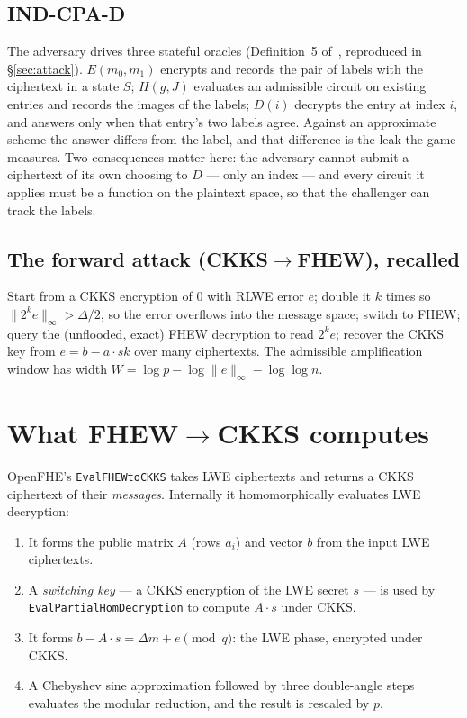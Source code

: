 \documentclass[11pt]{article}
\newcommand{\fto}{\texorpdfstring{FHEW$\to$CKKS}{FHEW-to-CKKS}}
\newcommand{\ctf}{\texorpdfstring{CKKS$\to$FHEW}{CKKS-to-FHEW}}
\newcommand{\code}[1]{\texttt{#1}}
\begin{document}
\subsection{IND-CPA-D}
The adversary drives three stateful oracles (Definition~5 of~\cite{santato2026}, reproduced in
\S\ref{sec:attack}). $E(m_0, m_1)$ encrypts and records the pair of labels with the ciphertext in
a state $S$; $H(g, J)$ evaluates an admissible circuit on existing entries and records the images
of the labels; $D(i)$ decrypts the entry at index $i$, and answers only when that entry's two
labels agree. Against an approximate scheme the answer differs from the label, and that difference
is the leak the game measures. Two consequences matter here: the adversary cannot submit a
ciphertext of its own choosing to $D$ --- only an index --- and every circuit it applies must be a
function on the plaintext space, so that the challenger can track the labels.

\subsection{The forward attack (\ctf{}), recalled}
Start from a CKKS encryption of $0$ with RLWE error $e$; double it $k$ times so
$\|2^k e\|_\infty > \Delta/2$, so the error overflows into the message space; switch to FHEW; query
the (unflooded, exact) FHEW decryption to read $2^k e$; recover the CKKS key from
$e = b - a\cdot \mathit{sk}$ over many ciphertexts. The admissible amplification window has width
$W = \log p - \log\|e\|_\infty - \log\log n$.

\section{What \fto{} computes}
\label{sec:computes}

OpenFHE's \code{EvalFHEWtoCKKS} takes LWE ciphertexts and returns a CKKS ciphertext of their
\emph{messages}. Internally it homomorphically evaluates LWE decryption:
\begin{enumerate}
  \item It forms the public matrix $A$ (rows $a_i$) and vector $b$ from the input LWE ciphertexts.
  \item A \emph{switching key} --- a CKKS encryption of the LWE secret $s$ --- is used by
    \code{EvalPartialHomDecryption} to compute $A\cdot s$ under CKKS.
  \item It forms $b - A\cdot s = \Delta m + e \pmod q$: the LWE phase, encrypted under CKKS.
  \item A Chebyshev sine approximation followed by three double-angle steps evaluates the modular
    reduction, and the result is rescaled by $p$.
\end{enumerate}
\end{document}
